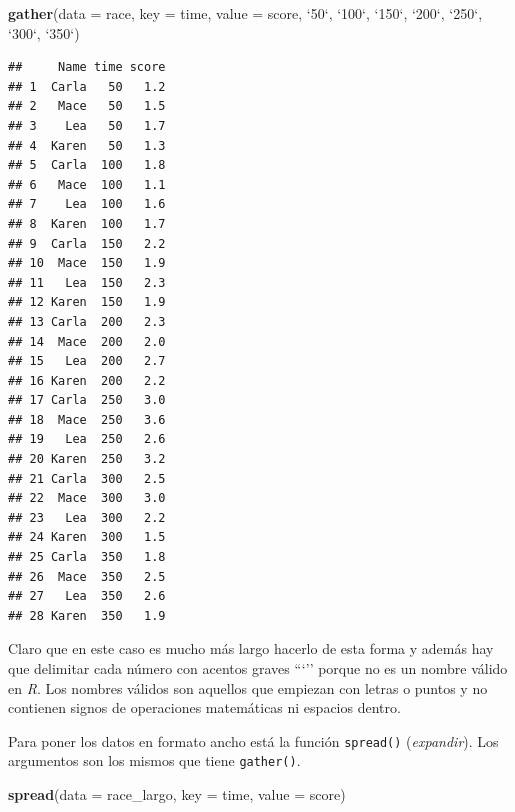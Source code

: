 \documentclass[]{book}
\newenvironment{Shaded}{\begin{snugshade}}{\end{snugshade}}
\newcommand{\DataTypeTok}[1]{\textcolor[rgb]{0.13,0.29,0.53}{#1}}
\newcommand{\KeywordTok}[1]{\textcolor[rgb]{0.13,0.29,0.53}{\textbf{#1}}}
\newcommand{\NormalTok}[1]{#1}
\newcommand{\StringTok}[1]{\textcolor[rgb]{0.31,0.60,0.02}{#1}}
\theoremstyle{definition}
\theoremstyle{definition}
\theoremstyle{definition}
\theoremstyle{remark}
\begin{document}
\begin{Shaded}
\begin{Highlighting}[]
\KeywordTok{gather}\NormalTok{(}\DataTypeTok{data =}\NormalTok{ race, }\DataTypeTok{key =}\NormalTok{ time, }\DataTypeTok{value =}\NormalTok{ score, }\StringTok{`}\DataTypeTok{50}\StringTok{`}\NormalTok{, }\StringTok{`}\DataTypeTok{100}\StringTok{`}\NormalTok{, }\StringTok{`}\DataTypeTok{150}\StringTok{`}\NormalTok{, }\StringTok{`}\DataTypeTok{200}\StringTok{`}\NormalTok{, }\StringTok{`}\DataTypeTok{250}\StringTok{`}\NormalTok{,}
       \StringTok{`}\DataTypeTok{300}\StringTok{`}\NormalTok{, }\StringTok{`}\DataTypeTok{350}\StringTok{`}\NormalTok{)}
\end{Highlighting}
\end{Shaded}

\begin{verbatim}
##     Name time score
## 1  Carla   50   1.2
## 2   Mace   50   1.5
## 3    Lea   50   1.7
## 4  Karen   50   1.3
## 5  Carla  100   1.8
## 6   Mace  100   1.1
## 7    Lea  100   1.6
## 8  Karen  100   1.7
## 9  Carla  150   2.2
## 10  Mace  150   1.9
## 11   Lea  150   2.3
## 12 Karen  150   1.9
## 13 Carla  200   2.3
## 14  Mace  200   2.0
## 15   Lea  200   2.7
## 16 Karen  200   2.2
## 17 Carla  250   3.0
## 18  Mace  250   3.6
## 19   Lea  250   2.6
## 20 Karen  250   3.2
## 21 Carla  300   2.5
## 22  Mace  300   3.0
## 23   Lea  300   2.2
## 24 Karen  300   1.5
## 25 Carla  350   1.8
## 26  Mace  350   2.5
## 27   Lea  350   2.6
## 28 Karen  350   1.9
\end{verbatim}

Claro que en este caso es mucho más largo hacerlo de esta forma y además
hay que delimitar cada número con acentos graves ```'' porque no es un
nombre válido en \emph{R}. Los nombres válidos son aquellos que empiezan
con letras o puntos y no contienen signos de operaciones matemáticas ni
espacios dentro.

Para poner los datos en formato ancho está la función \texttt{spread()}
(\emph{expandir}). Los argumentos son los mismos que tiene
\texttt{gather()}.

\begin{Shaded}
\begin{Highlighting}[]
\KeywordTok{spread}\NormalTok{(}\DataTypeTok{data =}\NormalTok{ race_largo, }\DataTypeTok{key =}\NormalTok{ time, }\DataTypeTok{value =}\NormalTok{ score)}
\end{Highlighting}
\end{Shaded}
\end{document}
